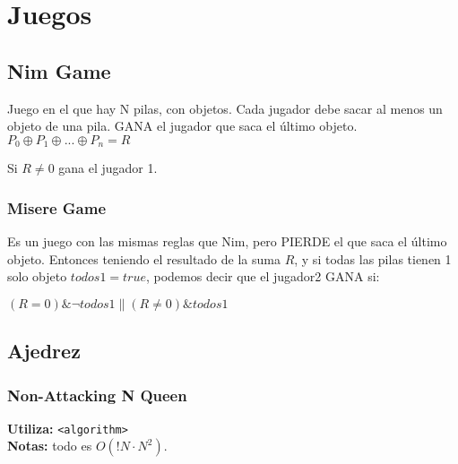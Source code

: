 \section{Juegos}
\subsection{Nim Game}
Juego en el que hay N pilas, con objetos. Cada jugador debe sacar al menos un objeto de una pila. GANA el jugador que saca el \'ultimo objeto.
$P_0{\oplus}P_1{\oplus}...{\oplus}P_n = R$

Si $R{\neq}0$ gana el jugador 1.
\subsubsection{Misere Game}
Es un juego con las mismas reglas que Nim, pero PIERDE el que saca el \'ultimo objeto. Entonces teniendo el resultado de la suma $R$, y 
si todas las pilas tienen 1 solo objeto $todos1{=}true$, podemos decir que el jugador2 GANA si:

${(R{=}0){\&}{\neg}{todos1}{\parallel}(R{\neq}0 ){\&}{todos1}}$
\subsection{Ajedrez}
\subsubsection{Non-Attacking N Queen}
\begin{footnotesize}
	\textbf{Utiliza:} \texttt{<algorithm>}\\
	\textbf{Notas:} todo es $ O(!N \cdot N^{2})$.
\end{footnotesize}

